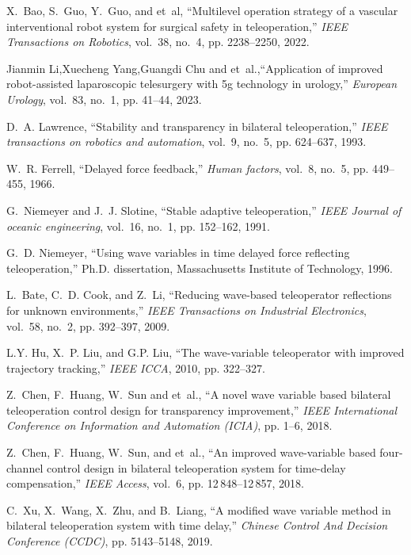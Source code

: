 \begin{thebibliography}{00}
     X.~Bao, S.~Guo, Y.~Guo, and et~al, ``Multilevel operation strategy of a vascular interventional robot system for surgical safety in teleoperation,'' \emph{IEEE Transactions on Robotics}, vol.~38, no.~4, pp. 2238--2250, 2022.

     Jianmin Li,Xuecheng Yang,Guangdi Chu and et~al.,``Application of improved robot-assisted laparoscopic telesurgery with 5g technology in urology,'' \emph{European Urology}, vol.~83, no.~1, pp. 41--44, 2023.

     D.~A. Lawrence, ``Stability and transparency in bilateral teleoperation,'' \emph{IEEE transactions on robotics and automation}, vol.~9, no.~5, pp. 624--637, 1993.

     W.~R. Ferrell, ``Delayed force feedback,'' \emph{Human factors}, vol.~8, no.~5, pp. 449--455, 1966.

     G.~Niemeyer and J.~J. Slotine, ``Stable adaptive teleoperation,'' \emph{IEEE Journal of oceanic engineering}, vol.~16, no.~1, pp. 152--162, 1991.

     G.~D. Niemeyer, ``Using wave variables in time delayed force reflecting teleoperation,'' Ph.D. dissertation, Massachusetts Institute of Technology, 1996.

     L.~Bate, C.~D. Cook, and Z.~Li, ``Reducing wave-based teleoperator reflections for unknown environments,'' \emph{IEEE Transactions on Industrial Electronics}, vol.~58, no.~2, pp. 392--397, 2009.

     L.Y. Hu, X.~P. Liu, and G.P. Liu, ``The wave-variable teleoperator with improved trajectory tracking,''  \emph{IEEE ICCA}, 2010, pp. 322--327.

     Z.~Chen, F.~Huang, W.~Sun and et~al., ``A novel wave variable based bilateral teleoperation control design for transparency improvement,''  \emph{IEEE International Conference on Information and Automation (ICIA)}, pp. 1--6, 2018.

     Z.~Chen, F.~Huang, W.~Sun, and et~al., ``An improved wave-variable based four-channel control design in bilateral teleoperation system for time-delay compensation,'' \emph{IEEE Access}, vol.~6, pp. 12\,848--12\,857, 2018.

     C.~Xu, X.~Wang, X.~Zhu, and B.~Liang, ``A modified wave variable method in bilateral teleoperation system with time delay,''  \emph{Chinese Control And Decision Conference (CCDC)}, pp. 5143--5148, 2019.


\end{thebibliography}
